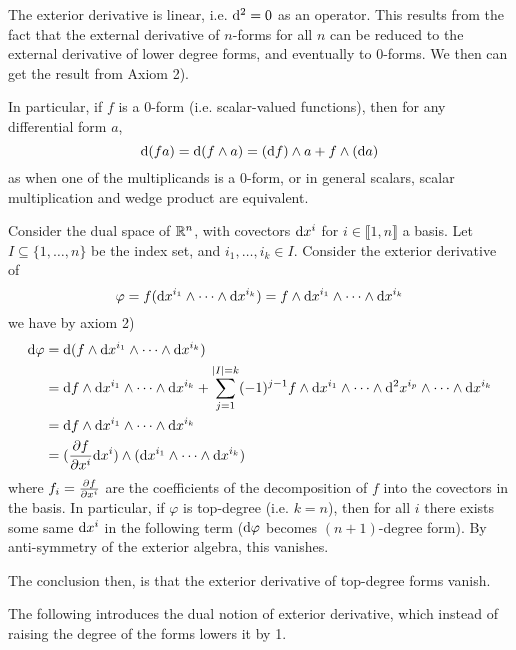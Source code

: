 \documentclass{article}
\begin{document}
\begin{remark}
    The exterior derivative is linear, i.e. $\mathrm{d}^2 = 0$ as an operator. This results from the fact that the external derivative of $n$-forms for all $n$ can be reduced to the external derivative of lower degree forms, and eventually to $0$-forms. We then can get the result from Axiom 2).
\end{remark}

\begin{remark}
    In particular, if $f$ is a $0$-form (i.e. scalar-valued functions), then for any differential form $a$,
    \[
     \mathrm{d}(fa) = \mathrm{d}(f \wedge a) = (\mathrm{d} f) \wedge a + f \wedge (\mathrm{d} a)
    \]
    as when one of the multiplicands is a $0$-form, or in general scalars, scalar multiplication and wedge product are equivalent. 
\end{remark}

\begin{example}
    Consider the dual space of $\mathbb{R}^n$, with covectors $\mathrm{d} x^i$ for $i \in \llbracket 1, n \rrbracket$ a basis. Let $I \subseteq \{1, \dots, n\}$ be the index set, and $i_1, \dots, i_k \in I$. Consider the exterior derivative of
    \[
        \varphi = f(\mathrm{d} x^{i_1} \wedge \dots \wedge \mathrm{d} x^{i_k}) =  f \wedge \mathrm{d} x^{i_1} \wedge \dots \wedge \mathrm{d} x^{i_k}
    \]
    we have by axiom 2)
    \begin{align*}
        \mathrm{d} \varphi
        & = \mathrm{d} (f \wedge \mathrm{d} x^{i_1} \wedge \dots \wedge \mathrm{d} x^{i_k}) \\
        & = \mathrm{d} f \wedge \mathrm{d} x^{i_1} \wedge \dots \wedge \mathrm{d} x^{i_k} + \sum_{j = 1}^{\left|I\right| = k} (-1)^{j - 1} f \wedge \mathrm{d} x^{i_1} \wedge \dots \wedge \mathrm{d}^2 x^{i_p} \wedge \dots \wedge \mathrm{d} x^{i_k} \\
        & = \mathrm{d} f \wedge \mathrm{d} x^{i_1} \wedge \dots \wedge \mathrm{d} x^{i_k} \\
        & = (\frac{\partial f}{\partial x^i} \mathrm{d} x^i) \wedge (\mathrm{d} x^{i_1} \wedge \dots \wedge \mathrm{d} x^{i_k})
    \end{align*}
    where $f_i = \frac{\partial f}{\partial x^i}$ are the coefficients of the decomposition of $f$ into the covectors in the basis. In particular, if $\varphi$ is top-degree (i.e. $k = n$), then for all $i$ there exists some same $\mathrm{d} x^i$ in the following term ($\mathrm{d} \varphi$ becomes $(n+1)$-degree form). By anti-symmetry of the exterior algebra, this vanishes.

    The conclusion then, is that the exterior derivative of top-degree forms vanish. 
\end{example}

\textstart
The following introduces the dual notion of exterior derivative, which instead of raising the degree of the forms lowers it by 1.
\end{document}
